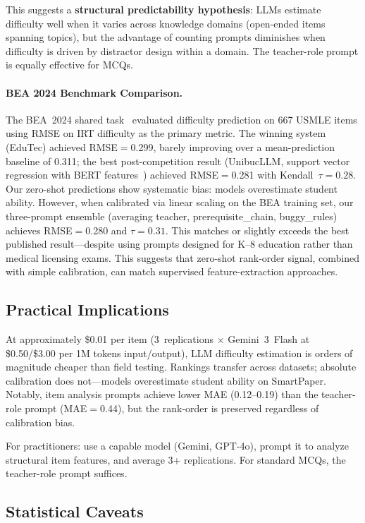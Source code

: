 \documentclass[runningheads]{llncs}
\begin{document}
This suggests a \textbf{structural predictability hypothesis}: LLMs estimate difficulty well when it varies across knowledge domains (open-ended items spanning topics), but the advantage of counting prompts diminishes when difficulty is driven by distractor design within a domain. The teacher-role prompt is equally effective for MCQs.

\paragraph{BEA 2024 Benchmark Comparison.}
The BEA~2024 shared task~\cite{yaneva2024} evaluated difficulty prediction on 667 USMLE items using RMSE on IRT difficulty as the primary metric. The winning system (EduTec) achieved RMSE$=$0.299, barely improving over a mean-prediction baseline of 0.311; the best post-competition result (UnibucLLM, support vector regression with BERT features~\cite{rogoz2024}) achieved RMSE$=$0.281 with Kendall~$\tau=0.28$. Our zero-shot predictions show systematic bias: models overestimate student ability. However, when calibrated via linear scaling on the BEA training set, our three-prompt ensemble (averaging teacher, prerequisite\_chain, buggy\_rules) achieves RMSE$=$0.280 and $\tau=0.31$. This matches or slightly exceeds the best published result---despite using prompts designed for K--8 education rather than medical licensing exams. This suggests that zero-shot rank-order signal, combined with simple calibration, can match supervised feature-extraction approaches.

\subsection{Practical Implications}

At approximately \$0.01 per item (3~replications $\times$ Gemini~3~Flash at \$0.50/\$3.00 per 1M tokens input/output), LLM difficulty estimation is orders of magnitude cheaper than field testing. Rankings transfer across datasets; absolute calibration does not---models overestimate student ability on SmartPaper. Notably, item analysis prompts achieve lower MAE (0.12--0.19) than the teacher-role prompt (MAE$=$0.44), but the rank-order is preserved regardless of calibration bias.

For practitioners: use a capable model (Gemini, GPT-4o), prompt it to analyze structural item features, and average 3+ replications. For standard MCQs, the teacher-role prompt suffices.

\subsection{Statistical Caveats}
\end{document}
